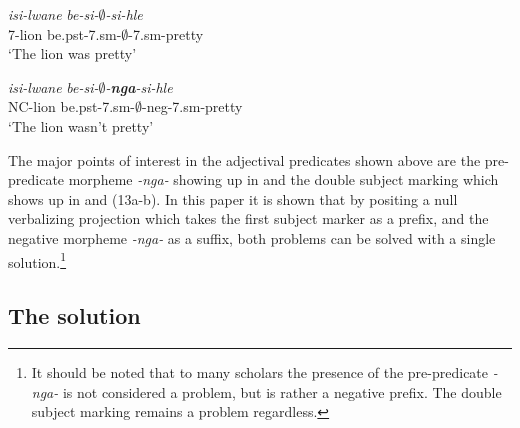 \documentclass[output=paper]{langsci/langscibook}
\newcommand{\nga}[0]{\textit {-nga- }}
\begin{document}
\begin{exe}
\ex \begin{xlist}
\ex \gll \textit{isi-lwane} \textit{be-si-$\emptyset$-si-hle}\\
       7-lion be.{\sc pst}-7.{\sc sm}-$\emptyset$-7.{\sc sm}-pretty\\
    \glt `The lion was pretty' 

\ex \gll \textit{isi-lwane} \textit{be-si-$\emptyset$-\textbf{nga}-si-hle}\\
       NC-lion be.{\sc pst}-7.{\sc sm}-$\emptyset$-{\sc neg}-7.{\sc sm}-pretty\\
    \glt `The lion wasn't pretty' 
\end{xlist}
\end{exe}

The major points of interest in the adjectival predicates shown above are the pre-predicate morpheme \nga showing up in  and the double subject marking which shows up in  and (13a-b). In this paper it is shown that by positing a null verbalizing projection which takes the first subject marker as a prefix, and the negative morpheme \nga as a suffix, both problems can be solved with a single solution.\footnote{It should be noted that to many scholars the presence of the pre-predicate \nga is not considered a problem, but is rather a negative prefix. The double subject marking remains a problem regardless.}

\subsection {The solution}
\end{document}
